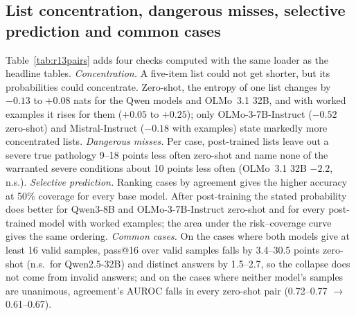 \documentclass[11pt]{article}
\begin{document}
\subsection{List concentration, dangerous misses, selective prediction and common cases}\label{sec:joint}
Table~\ref{tab:r13pairs} adds four checks computed with the same loader as the headline tables. \emph{Concentration.} A five-item list could not get shorter, but its probabilities could concentrate. Zero-shot, the entropy of one list changes by $-0.13$ to $+0.08$ nats for the Qwen models and OLMo~3.1 32B, and with worked examples it rises for them ($+0.05$ to $+0.25$); only OLMo-3-7B-Instruct ($-0.52$ zero-shot) and Mistral-Instruct ($-0.18$ with examples) state markedly more concentrated lists. \emph{Dangerous misses.} Per case, post-trained lists leave out a severe true pathology 9--18 points less often zero-shot and name none of the warranted severe conditions about 10 points less often (OLMo~3.1 32B $-2.2$, n.s.). \emph{Selective prediction.} Ranking cases by agreement gives the higher accuracy at 50\% coverage for every base model. After post-training the stated probability does better for Qwen3-8B and OLMo-3-7B-Instruct zero-shot and for every post-trained model with worked examples; the area under the risk--coverage curve gives the same ordering. \emph{Common cases.} On the cases where both models give at least 16 valid samples, pass@16 over valid samples falls by 3.4--30.5 points zero-shot (n.s.\ for Qwen2.5-32B) and distinct answers by 1.5--2.7, so the collapse does not come from invalid answers; and on the cases where neither model's samples are unanimous, agreement's AUROC falls in every zero-shot pair (0.72--0.77 $\rightarrow$ 0.61--0.67).
\end{document}
